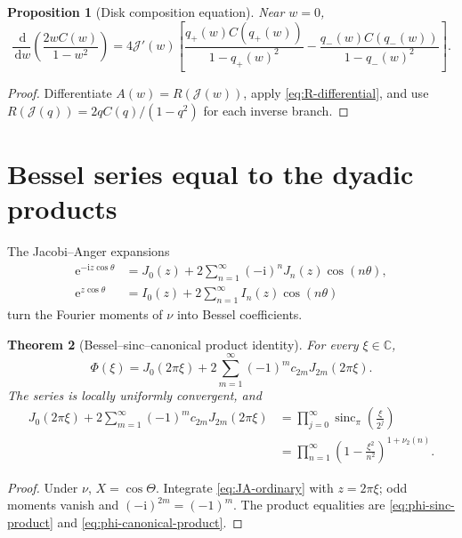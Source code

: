 \documentclass[11pt,oneside]{article}
\newtheorem{theorem}{Theorem}[section]
\newtheorem{proposition}[theorem]{Proposition}
\theoremstyle{definition}
\newcommand{\sincpi}{\operatorname{sinc}_{\!\pi}}
\newcommand{\dd}{\,\mathrm d}
\newcommand{\ee}{\mathrm e}
\newcommand{\ii}{\mathrm i}
\newcommand{\vTwo}{\nu_2}
\newcommand{\Jouk}{\mathcal J}
\begin{document}
\begin{proposition}[Disk composition equation]
\label{prop:disk-composition}
Near \(w=0\),
\begin{equation}
 \frac{\dd}{\dd w}\left(\frac{2wC(w)}{1-w^2}\right)
 =4\Jouk'(w)\left[
 \frac{q_+(w)C(q_+(w))}{1-q_+(w)^2}
 -\frac{q_-(w)C(q_-(w))}{1-q_-(w)^2}
 \right].
 \label{eq:disk-composition}
\end{equation}
\end{proposition}

\begin{proof}
Differentiate \(A(w)=R(\Jouk(w))\), apply \eqref{eq:R-differential}, and use
\(R(\Jouk(q))=2qC(q)/(1-q^2)\) for each inverse branch.
\end{proof}

\section{Bessel series equal to the dyadic products}
\label{sec:bessel}

The Jacobi--Anger expansions
\begin{align}
 \ee^{-\ii z\cos\theta}
 &=J_0(z)+2\sum_{n=1}^{\infty}(-\ii)^nJ_n(z)\cos(n\theta),
 \label{eq:JA-ordinary}\\
 \ee^{z\cos\theta}
 &=I_0(z)+2\sum_{n=1}^{\infty}I_n(z)\cos(n\theta)
 \label{eq:JA-modified}
\end{align}
turn the Fourier moments of \(\nu\) into Bessel coefficients.

\begin{theorem}[Bessel--sinc--canonical product identity]
\label{thm:Bessel-Phi}
For every \(\xi\in\mathbb C\),
\begin{equation}
 \boxed{\displaystyle
 \Phi(\xi)=J_0(2\pi\xi)
 +2\sum_{m=1}^{\infty}(-1)^m c_{2m}J_{2m}(2\pi\xi).}
 \label{eq:Phi-Bessel}
\end{equation}
The series is locally uniformly convergent, and
\begin{align}
 J_0(2\pi\xi)+2\sum_{m=1}^{\infty}(-1)^mc_{2m}J_{2m}(2\pi\xi)
 &=\prod_{j=0}^{\infty}\sincpi\!\left(\frac{\xi}{2^j}\right)
 \label{eq:Bessel-sinc}\\
 &=\prod_{n=1}^{\infty}\left(1-\frac{\xi^2}{n^2}\right)^{1+\vTwo(n)}.
 \label{eq:Bessel-canonical}
\end{align}
\end{theorem}

\begin{proof}
Under \(\nu\), \(X=\cos\Theta\). Integrate \eqref{eq:JA-ordinary} with
\(z=2\pi\xi\); odd moments vanish and \((-\ii)^{2m}=(-1)^m\). The product equalities are
\eqref{eq:phi-sinc-product} and \eqref{eq:phi-canonical-product}.
\end{proof}
\end{document}
